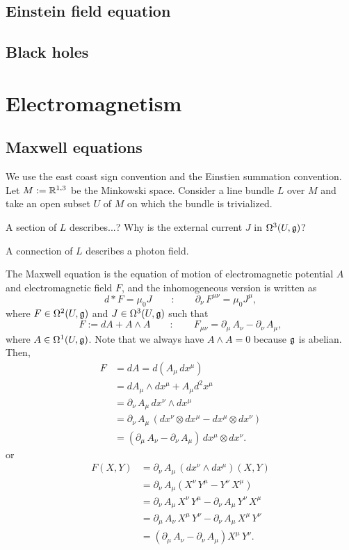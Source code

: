 \documentclass{../../large}
\begin{document}
\section{Einstein field equation}
\section{Black holes}



\chapter{Electromagnetism}
\section{Maxwell equations}
We use the east coast sign convention and the Einstien summation convention.
Let $M:=\mathbb{R}^{1,3}$ be the Minkowski space.
Consider a line bundle $L$ over $M$ and take an open subset $U$ of $M$ on which the bundle is trivialized.

A section of $L$ describes...?
Why is the external current $J$ in $\Omega^3(U,\mathfrak{g})$?

A connection of $L$ describes a photon field.

The Maxwell equation is the equation of motion of electromagnetic potential $A$ and electromagnetic field $F$, and the inhomogeneous version is written as
\[d*F=\mu_0 J\qquad:\qquad\partial_\nu\,F^{\mu\nu}=\mu_0J^\mu,\]
where $F\in\Omega^2(U,\mathfrak{g})$ and $J\in\Omega^3(U,\mathfrak{g})$ such that
\[F:=dA+A\wedge A\qquad:\qquad F_{\mu\nu}=\partial_\mu\,A_\nu-\partial_\nu\,A_\mu,\]
where $A\in\Omega^1(U,\mathfrak{g})$.
Note that we always have $A\wedge A=0$ because $\mathfrak{g}$ is abelian.
Then,
\begin{align*}
F&=dA=d(A_\mu\,dx^\mu)\\
&=dA_\mu\wedge dx^\mu+A_\mu d^2x^\mu\\
&=\partial_\nu\,A_\mu\,dx^\nu\wedge dx^\mu\\
&=\partial_\nu\,A_\mu\,(dx^\nu\otimes dx^\mu-dx^\mu\otimes dx^\nu)\\
&=(\partial_\mu\,A_\nu-\partial_\nu\,A_\mu)\,dx^\mu\otimes dx^\nu.
\end{align*}
or
\begin{align*}
F(X,Y)
&=\partial_\nu\,A_\mu\,(dx^\nu\wedge dx^\mu)(X,Y)\\
&=\partial_\nu\,A_\mu(X^\nu\,Y^\mu-Y^\nu\,X^\mu)\\
&=\partial_\nu\,A_\mu\,X^\nu\,Y^\mu-\partial_\nu\,A_\mu\,Y^\nu\,X^\mu\\
&=\partial_\mu\,A_\nu\,X^\mu\,Y^\nu-\partial_\nu\,A_\mu\,X^\mu\,Y^\nu\\
&=(\partial_\mu\,A_\nu-\partial_\nu\,A_\mu)X^\mu\,Y^\nu.
\end{align*}
\end{document}
